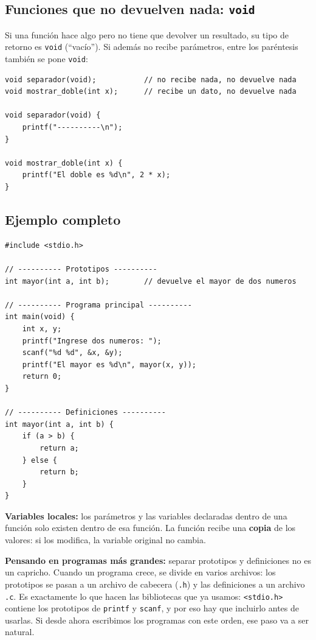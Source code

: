 \subsection{Funciones que no devuelven nada: \texttt{void}}

Si una función hace algo pero no tiene que devolver un resultado, su tipo de retorno es \texttt{void} (``vacío''). Si además no recibe parámetros, entre los paréntesis también se pone \texttt{void}:

\begin{lstlisting}[style=estilo-c]
void separador(void);           // no recibe nada, no devuelve nada
void mostrar_doble(int x);      // recibe un dato, no devuelve nada

void separador(void) {
    printf("----------\n");
}

void mostrar_doble(int x) {
    printf("El doble es %d\n", 2 * x);
}
\end{lstlisting}

\subsection{Ejemplo completo}

\begin{lstlisting}[style=estilo-c]
#include <stdio.h>

// ---------- Prototipos ----------
int mayor(int a, int b);        // devuelve el mayor de dos numeros

// ---------- Programa principal ----------
int main(void) {
    int x, y;
    printf("Ingrese dos numeros: ");
    scanf("%d %d", &x, &y);
    printf("El mayor es %d\n", mayor(x, y));
    return 0;
}

// ---------- Definiciones ----------
int mayor(int a, int b) {
    if (a > b) {
        return a;
    } else {
        return b;
    }
}
\end{lstlisting}

\begin{notabox}
\textbf{Variables locales:} los parámetros y las variables declaradas dentro de una función solo existen dentro de esa función. La función recibe una \textbf{copia} de los valores: si los modifica, la variable original no cambia.
\end{notabox}

\begin{importantebox}
\textbf{Pensando en programas más grandes:} separar prototipos y definiciones no es un capricho. Cuando un programa crece, se divide en varios archivos: los prototipos se pasan a un archivo de cabecera (\texttt{.h}) y las definiciones a un archivo \texttt{.c}. Es exactamente lo que hacen las bibliotecas que ya usamos: \texttt{<stdio.h>} contiene los prototipos de \texttt{printf} y \texttt{scanf}, y por eso hay que incluirlo antes de usarlas. Si desde ahora escribimos los programas con este orden, ese paso va a ser natural.
\end{importantebox}

